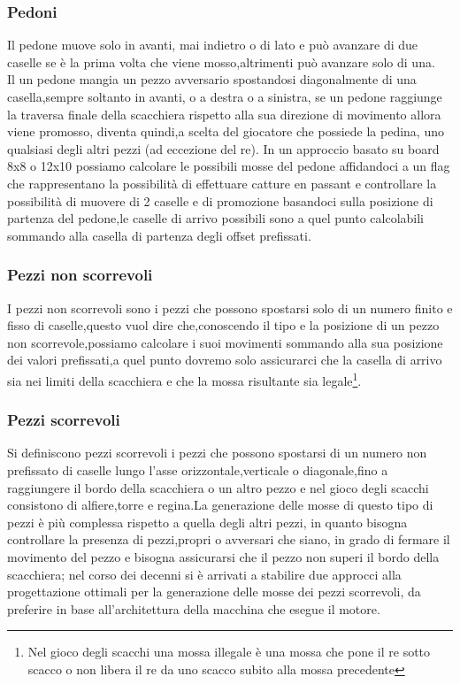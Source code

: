 \subsubsection{Pedoni}
Il pedone muove solo in avanti, mai indietro o di lato e può avanzare  di due caselle se è la prima volta che viene mosso,altrimenti può avanzare solo di una.
\\Il un pedone mangia un pezzo avversario spostandosi diagonalmente di una casella,sempre soltanto in avanti, o a destra o a sinistra, se un pedone raggiunge la traversa finale della scacchiera rispetto alla sua direzione di movimento
allora viene promosso, diventa quindi,a scelta del giocatore che possiede la pedina, uno qualsiasi degli altri pezzi  (ad eccezione del re).
In un approccio basato su board 8x8 o 12x10 possiamo calcolare le possibili mosse del pedone affidandoci a un flag che rappresentano la possibilità di effettuare catture en passant e controllare la possibilità 
di muovere di 2 caselle e di promozione basandoci sulla posizione di partenza del pedone,le caselle di arrivo possibili sono a quel punto calcolabili sommando alla casella di partenza degli offset prefissati.



\subsubsection{Pezzi non scorrevoli}
I pezzi non scorrevoli sono i pezzi che possono spostarsi solo di un numero finito e fisso di caselle,questo vuol dire che,conoscendo il tipo e la posizione di un pezzo non scorrevole,possiamo calcolare i suoi movimenti
sommando alla sua posizione dei valori prefissati,a quel punto dovremo solo assicurarci che la casella di arrivo sia nei limiti della scacchiera e che la mossa risultante sia legale\footnote{Nel gioco degli scacchi una mossa illegale è una mossa che pone il re sotto scacco o non libera il re da uno scacco subito alla mossa precedente}.

\subsubsection{Pezzi  scorrevoli}
Si definiscono pezzi scorrevoli i pezzi che possono spostarsi di un numero non prefissato di caselle lungo l'asse orizzontale,verticale o diagonale,fino a raggiungere il bordo della scacchiera o un altro pezzo
e nel gioco degli scacchi consistono di alfiere,torre e regina.La generazione delle mosse di questo tipo di pezzi è più complessa rispetto a quella degli altri pezzi, in quanto bisogna controllare la presenza di pezzi,propri
o avversari che siano, in grado di fermare il movimento del pezzo e bisogna assicurarsi che il pezzo non superi il bordo della scacchiera;
nel corso  dei decenni si è arrivati a stabilire due approcci alla progettazione ottimali per la generazione delle mosse dei pezzi scorrevoli, 
da preferire in base all'architettura della macchina che esegue il motore.

